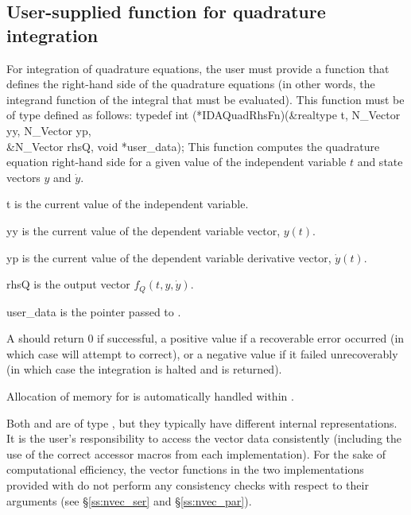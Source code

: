 {%

\subsection{User-supplied function for quadrature integration}
\label{ss:user_fct_quad}

For integration of quadrature equations, the user must provide a function 
that defines the right-hand side of the quadrature equations (in other words,
the integrand function of the integral that must be evaluated). This function
must be of type  defined as follows:
{
  typedef int (*IDAQuadRhsFn)(&realtype t, N\_Vector yy, N\_Vector yp,\\
                             &N\_Vector rhsQ, void *user\_data);
}
{
  This function computes the quadrature equation right-hand side for a given value
  of the independent variable $t$ and state vectors $y$ and $\dot{y}$.
}
{
  \begin{args}
  \item[t]
    is the current value of the independent variable.
  \item[yy]
    is the current value of the dependent variable vector, $y(t)$.
  \item[yp]
    is the current value of the dependent variable derivative vector, $\dot{y}(t)$.
  \item[rhsQ]
    is the output vector $f_Q(t,y,\dot{y})$.
  \item[user\_data]
    is the  pointer passed to .   
  \end{args}
}
{
  A  should return 0 if successful, a positive value if a recoverable
  error occurred (in which case {\idas} will attempt to correct), or a negative 
  value if it failed unrecoverably (in which case the integration is halted and
   is returned).
}
{
  Allocation of memory for  is automatically handled within {\idas}.

  Both  and  are of type ,
  but they  typically have different internal representations. It is the user's 
  responsibility to access the vector data consistently (including the use of the 
  correct accessor macros from each {\nvector} implementation). For the sake of 
  computational efficiency, the vector functions in the two {\nvector} implementations 
  provided with {\idas} do not perform any consistency checks with respect to their 
   arguments (see \S\ref{ss:nvec_ser} and \S\ref{ss:nvec_par}).

}}
